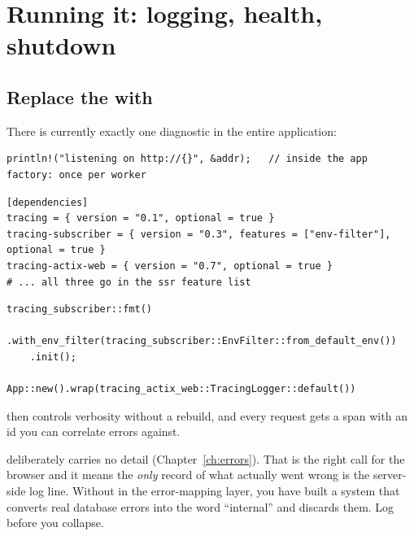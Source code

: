 \chapter{Running it: logging, health, shutdown}
\label{ch:ops}

\section{Replace the  with }

There is currently exactly one diagnostic in the entire application:

\begin{lstlisting}[style=rs]
println!("listening on http://{}", &addr);   // inside the app factory: once per worker
\end{lstlisting}

\begin{pattern}
\begin{lstlisting}[style=toml]
[dependencies]
tracing = { version = "0.1", optional = true }
tracing-subscriber = { version = "0.3", features = ["env-filter"], optional = true }
tracing-actix-web = { version = "0.7", optional = true }
# ... all three go in the ssr feature list
\end{lstlisting}

\begin{lstlisting}[style=rs]
tracing_subscriber::fmt()
    .with_env_filter(tracing_subscriber::EnvFilter::from_default_env())
    .init();

App::new().wrap(tracing_actix_web::TracingLogger::default())
\end{lstlisting}
 then controls verbosity without a rebuild, and every request
gets a span with an id you can correlate errors against.
\end{pattern}

\begin{why}
 deliberately carries no detail (Chapter~\ref{ch:errors}). That is the
right call for the browser and it means the \emph{only} record of what actually went wrong is the
server-side log line. Without  in the error-mapping layer, you have built a
system that converts real database errors into the word ``internal'' and discards them. Log before
you collapse.
\end{why}

